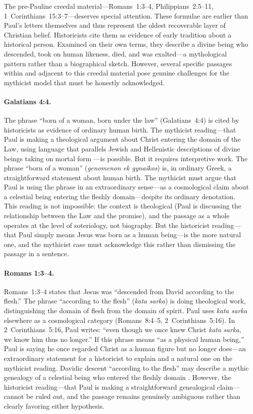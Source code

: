 \documentclass[12pt,oneside]{article}
\newcommand{\grk}[1]{\textit{#1}}   %
\begin{document}
The pre-Pauline creedal material---Romans~1:3--4, Philippians~2:5--11,
1~Corinthians~15:3--7---deserves special attention.  These formulae are
earlier than Paul's letters themselves and thus represent the oldest
recoverable layer of Christian belief.  Historicists cite them as
evidence of early tradition about a historical person.  Examined on
their own terms, they describe a divine being who descended, took on
human likeness, died, and was exalted---a mythological pattern rather
than a biographical sketch.  However, several specific passages within
and adjacent to this creedal material pose genuine challenges for the
mythicist model that must be honestly acknowledged.

\paragraph{Galatians 4:4.}
The phrase ``born of a woman, born under the law'' (Galatians~4:4) is
cited by historicists as evidence of ordinary human birth.  The mythicist
reading---that Paul is making a theological argument about Christ
entering the domain of the Law, using language that parallels Jewish and
Hellenistic descriptions of divine beings taking on mortal form
\citep{Doherty2009}---is possible.  But it requires interpretive work.
The phrase ``born of a woman'' (\grk{genomenon ek gynaikos}) is, in
ordinary Greek, a straightforward statement about human birth.  The
mythicist must argue that Paul is using the phrase in an extraordinary
sense---as a cosmological claim about a celestial being entering the
fleshly domain---despite its ordinary denotation.  This reading is not
impossible: the context is theological (Paul is discussing the
relationship between the Law and the promise), and the passage as a
whole operates at the level of soteriology, not biography.  But the
historicist reading---that Paul simply means Jesus was born as a human
being---is the more natural one, and the mythicist case must acknowledge
this rather than dismissing the passage in a sentence.

\paragraph{Romans 1:3--4.}
Romans~1:3--4 states that Jesus was ``descended from David according to
the flesh.''  The phrase ``according to the flesh'' (\grk{kata sarka})
is doing theological work, distinguishing the domain of flesh from the
domain of spirit.  Paul uses \grk{kata sarka} elsewhere as a
cosmological category (Romans~8:4--5, 2~Corinthians~5:16).  In
2~Corinthians~5:16, Paul writes: ``even though we once knew Christ
\grk{kata sarka}, we know him thus no longer.''  If this phrase means
``as a physical human being,'' Paul is saying he once regarded Christ as
a human figure but no longer does---an extraordinary statement for a
historicist to explain and a natural one on the mythicist reading.
Davidic descent ``according to the flesh'' may describe a mythic
genealogy of a celestial being who entered the fleshly domain
\citep{Carrier2014}.  However, the historicist reading---that Paul is
making a straightforward genealogical claim---cannot be ruled out, and
the passage remains genuinely ambiguous rather than clearly favoring
either hypothesis.
\end{document}
